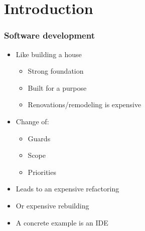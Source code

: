 \section{Introduction}
\SectionPage

\begin{frame}
  \frametitle{Software development}
  \begin{itemize}
    \item Like building a house
    \pause
    \begin{itemize}
      \item Strong foundation
      \pause
      \item Built for a purpose
      \pause
      \item Renovations/remodeling is expensive
      \pause
    \end{itemize}
    \item Change of:
    \pause
    \begin{itemize}
      \item Guards
      \pause
      \item Scope
      \pause
      \item Priorities
      \pause
    \end{itemize}
    \item Leads to an expensive refactoring
    \pause
    \item Or expensive rebuilding
    \pause
    \item A concrete example is an IDE
  \end{itemize}
\end{frame}

